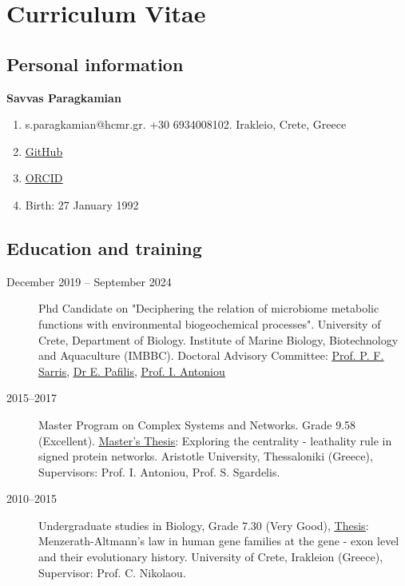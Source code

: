 \chapter{Curriculum Vitae}
\label{app:cv}

\section{Personal information}

\textbf{Savvas Paragkamian}

\begin{enumerate}

    \item[] s.paragkamian@hcmr.gr. +30 6934008102. Irakleio, Crete, Greece
    \item[] \underline{\href{https://github.com/savvas-paragkamian}{GitHub}}
    \item[] \underline{\href{https://orcid.org/0000-0002-8508-2521}{ORCID}}
    \item[] Birth: 27 January 1992
\end{enumerate}
  
\section{Education and training}

\begin{description}
    \item[December 2019 -- September 2024] Phd Candidate on "Deciphering the relation of microbiome metabolic functions with environmental biogeochemical processes".
    University of Crete, Department of Biology. Institute of Marine Biology, Biotechnology and Aquaculture (IMBBC).
Doctoral Advisory Committee: \underline{\href{https://www.imbb.forth.gr/imbb-people/en/sarris-home}{Prof. P. F. Sarris}}, \underline{\href{http://lab42open.hcmr.gr}{Dr E. Pafilis}}, \underline{\href{https://cosynet.auth.gr/didaskontes-instructors/}{Prof. I. Antoniou}}
  
    \item[2015--2017] Master Program on Complex Systems and Networks. Grade 9.58 (Excellent).
    \underline{\href{https://doi.org/10.13140/RG.2.2.32339.63520}{Master's Thesis}}: Exploring the centrality - leathality rule in signed protein networks.
    Aristotle University, Thessaloniki (Greece), Supervisors: Prof. I. Antoniou, Prof. S. Sgardelis.

    \item[2010--2015] Undergraduate studies in Biology, Grade 7.30 (Very Good),
        \underline{\href{http://dx.doi.org/10.13140/RG.2.2.25628.74886}{Thesis}}:
        Menzerath-Altmann's law in human gene families at the gene - exon level and their evolutionary history.
        University of Crete, Irakleion (Greece), Supervisor: Prof. C. Nikolaou.
  
\end{description}

